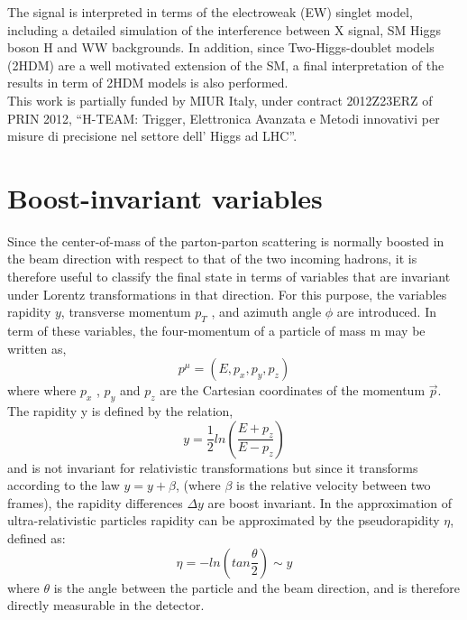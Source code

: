 \documentclass[PhD,binding=0.6cm]{../sapthesis}
\begin{document}
The signal is interpreted in terms of the electroweak (EW) singlet model, including a detailed simulation of the interference between X signal, SM Higgs boson H and WW backgrounds.
In addition, since  Two-Higgs-doublet models (2HDM)  are a well motivated extension of the SM, a final interpretation of the results in term of 2HDM models is also performed.\\
\newline
This work is partially funded by MIUR Italy, under contract 2012Z23ERZ of PRIN 2012, ``H-TEAM: Trigger, Elettronica Avanzata e Metodi innovativi per misure di precisione nel settore dell’ Higgs ad LHC''.

\mainmatter


{} 
{} 
{} 
{} 
{} 
{}
{}
{}
{}
{}
{} 
{} 

\appendix

\chapter{Boost-invariant variables}
\label{psr}
Since the center-of-mass of the parton-parton scattering is normally boosted in the beam
direction with respect to that of the two incoming hadrons, it is therefore useful to classify
the final state in terms of variables that are invariant under Lorentz transformations in
that direction. For this purpose, the variables rapidity $y$, transverse momentum $p_T$ , and
azimuth angle $\phi$ are introduced. In term of these variables, the four-momentum of a
particle of mass m may be written as,
\begin{equation}
p^{\mu}=(E,p_x,p_y,p_z)
\end{equation}
where where $p_x$ , $p_y$ and $p_z$ are the Cartesian coordinates of the momentum $\vec{p}$. 
The rapidity y is defined by the relation,
\begin{equation}
y=\frac{1}{2} ln (\frac{E+p_z}{E-p_z})
\end{equation}
and is not invariant for relativistic transformations but since it transforms according to
the law $y = y + \beta$, (where $\beta$ is the relative velocity between two frames), the rapidity
differences $\Delta y$ are boost invariant. In the approximation of ultra-relativistic particles rapidity can be approximated by the pseudorapidity $\eta$, defined as:
\begin{equation}
\eta=- ln (tan \frac{\theta}{2}) \sim y
\end{equation}
where $\theta$ is the angle between the particle and the beam direction, and
is therefore directly measurable in the detector.
\end{document}
